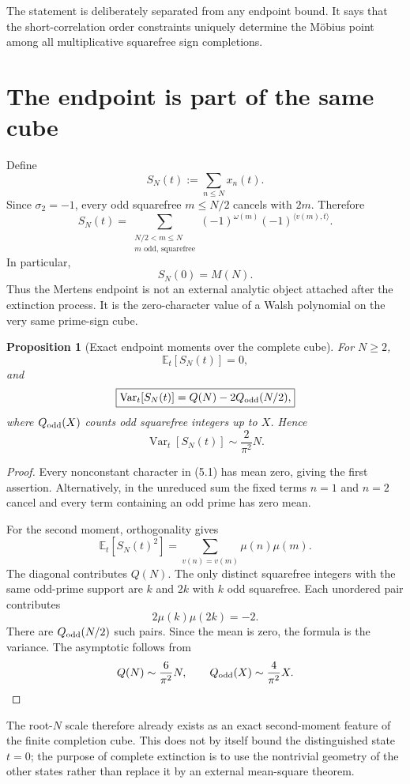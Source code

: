 \documentclass[11pt]{article}
\newtheorem{proposition}[theorem]{Proposition}
\theoremstyle{definition}
\theoremstyle{remark}
\begin{document}
The statement is deliberately separated from any endpoint bound.  It says that the short-correlation order constraints uniquely determine the M\"obius point among all multiplicative squarefree sign completions.

\section{The endpoint is part of the same cube}

Define
\[
 S_N(t):=\sum_{n\le N}x_n(t).
\]
Since $\sigma_2=-1$, every odd squarefree $m\le N/2$ cancels with $2m$.  Therefore
\[
 \boxed{
 S_N(t)=
 \sum_{\substack{N/2<m\le N\\m\text{ odd, squarefree}}}
 (-1)^{\omega(m)}(-1)^{\langle v(m),t\rangle}.
 }
 \tag{5.1}
\]
In particular,
\[
 \boxed{S_N(0)=M(N).}
\]
Thus the Mertens endpoint is not an external analytic object attached after the extinction process.  It is the zero-character value of a Walsh polynomial on the very same prime-sign cube.

\begin{proposition}[Exact endpoint moments over the complete cube]\label{prop:endpoint-moments}
For $N\ge2$,
\[
 \boxed{\mathbb E_t[S_N(t)]=0,}
\]
and
\[
 \boxed{
 \operatorname{Var}_t[S_N(t)]
 =Q(N)-2Q_{\rm odd}(N/2),
 }
\]
where $Q_{\rm odd}(X)$ counts odd squarefree integers up to $X$.  Hence
\[
 \operatorname{Var}_t[S_N(t)]\sim\frac{2}{\pi^2}N.
\]
\end{proposition}

\begin{proof}
Every nonconstant character in (5.1) has mean zero, giving the first assertion.  Alternatively, in the unreduced sum the fixed terms $n=1$ and $n=2$ cancel and every term containing an odd prime has zero mean.

For the second moment, orthogonality gives
\[
 \mathbb E_t[S_N(t)^2]
 =\sum_{v(n)=v(m)}\mu(n)\mu(m).
\]
The diagonal contributes $Q(N)$.  The only distinct squarefree integers with the same odd-prime support are $k$ and $2k$ with $k$ odd squarefree.  Each unordered pair contributes
\[
 2\mu(k)\mu(2k)=-2.
\]
There are $Q_{\rm odd}(N/2)$ such pairs.  Since the mean is zero, the formula is the variance.  The asymptotic follows from
\[
 Q(N)\sim\frac6{\pi^2}N,
 \qquad
 Q_{\rm odd}(X)\sim\frac4{\pi^2}X.
\]
\end{proof}

The root-$N$ scale therefore already exists as an exact second-moment feature of the finite completion cube.  This does not by itself bound the distinguished state $t=0$; the purpose of complete extinction is to use the nontrivial geometry of the other states rather than replace it by an external mean-square theorem.
\end{document}
